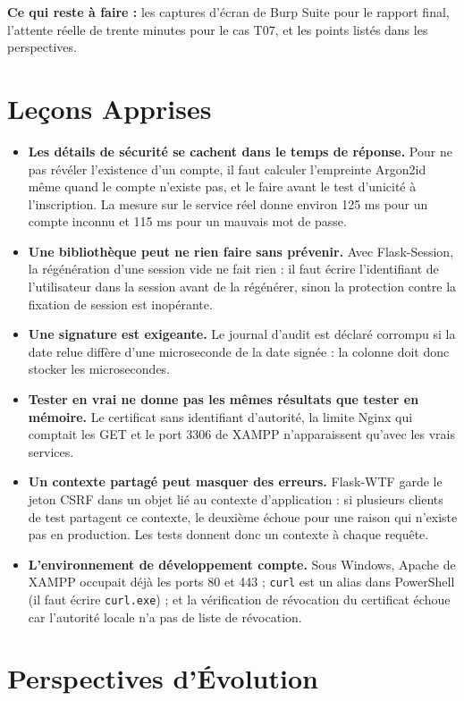 \documentclass[12pt,a4paper]{report}
\newcommand{\code}[1]{\texttt{\NoAutoSpacing #1}}
\begin{document}
\textbf{Ce qui reste à faire :} les captures d'écran de Burp Suite pour le rapport final, l'attente réelle de trente minutes pour le cas T07, et les points listés dans les perspectives.

\section{Leçons Apprises}

\begin{itemize}
  \item \textbf{Les détails de sécurité se cachent dans le temps de réponse.} Pour ne pas révéler l'existence d'un compte, il faut calculer l'empreinte Argon2id même quand le compte n'existe pas, et le faire avant le test d'unicité à l'inscription. La mesure sur le service réel donne environ 125 ms pour un compte inconnu et 115 ms pour un mauvais mot de passe.
  \item \textbf{Une bibliothèque peut ne rien faire sans prévenir.} Avec Flask-Session, la régénération d'une session vide ne fait rien : il faut écrire l'identifiant de l'utilisateur dans la session avant de la régénérer, sinon la protection contre la fixation de session est inopérante.
  \item \textbf{Une signature est exigeante.} Le journal d'audit est déclaré corrompu si la date relue diffère d'une microseconde de la date signée : la colonne doit donc stocker les microsecondes.
  \item \textbf{Tester en vrai ne donne pas les mêmes résultats que tester en mémoire.} Le certificat sans identifiant d'autorité, la limite Nginx qui comptait les GET et le port 3306 de XAMPP n'apparaissent qu'avec les vrais services.
  \item \textbf{Un contexte partagé peut masquer des erreurs.} Flask-WTF garde le jeton CSRF dans un objet lié au contexte d'application : si plusieurs clients de test partagent ce contexte, le deuxième échoue pour une raison qui n'existe pas en production. Les tests donnent donc un contexte à chaque requête.
  \item \textbf{L'environnement de développement compte.} Sous Windows, Apache de XAMPP occupait déjà les ports 80 et 443 ; \code{curl} est un alias dans PowerShell (il faut écrire \code{curl.exe}) ; et la vérification de révocation du certificat échoue car l'autorité locale n'a pas de liste de révocation.
\end{itemize}

\section{Perspectives d'Évolution}
\end{document}
